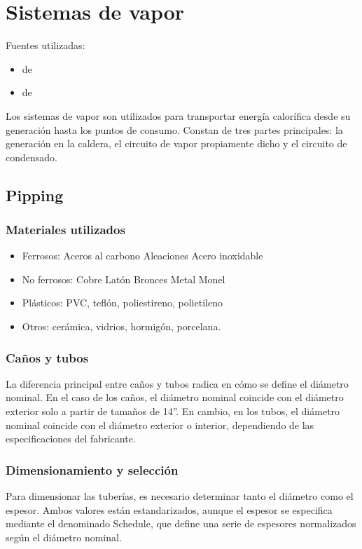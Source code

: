 \chapter{Sistemas de vapor}

Fuentes utilizadas:
\begin{itemize}
	\item {} de \cite{molanes2009vapor}
	\item {} de \cite{sarco-distribucion}
\end{itemize}

Los sistemas de vapor son utilizados para transportar energía calorífica desde su generación hasta los puntos de consumo. Constan de tres partes principales: la generación en la caldera, el circuito de vapor propiamente dicho y el circuito de condensado.



\section{Pipping}

\subsection{Materiales utilizados}
\begin{itemize}
    \item Ferrosos: Aceros al carbono Aleaciones Acero inoxidable
    \item No ferrosos: Cobre Latón Bronces Metal Monel
    \item Plásticos: PVC, teflón, poliestireno, polietileno
    \item Otros: cerámica, vidrios, hormigón, porcelana.
\end{itemize}

\subsection{Caños y tubos}

La diferencia principal entre caños y tubos radica en cómo se define el diámetro nominal. En el caso de los caños, el diámetro nominal coincide con el diámetro exterior solo a partir de tamaños de 14''. En cambio, en los tubos, el diámetro nominal coincide con el diámetro exterior o interior, dependiendo de las especificaciones del fabricante.


   \subsection{Dimensionamiento y selección}
Para dimensionar las tuberías, es necesario determinar tanto el diámetro como el espesor. Ambos valores están estandarizados, aunque el espesor se especifica mediante el denominado Schedule, que define una serie de espesores normalizados según el diámetro nominal.
